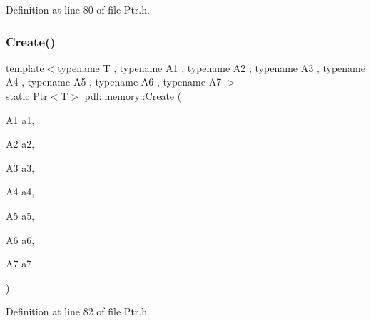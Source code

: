 Definition at line 80 of file Ptr.\+h.


\begin{DoxyCode}{0}

\end{DoxyCode}
\mbox{\label{namespacepdl_1_1memory_a10694890b7d9c279cc615fed02fd4baf}} 
\subsubsection{\texorpdfstring{Create()}{Create()}\hspace{0.1cm}{\footnotesize\ttfamily [8/8]}}
{\footnotesize\ttfamily template$<$typename T , typename A1 , typename A2 , typename A3 , typename A4 , typename A5 , typename A6 , typename A7 $>$ \\
static \mbox{\hyperlink{classpdl_1_1memory_1_1_ptr}{Ptr}}$<$T$>$ pdl\+::memory\+::\+Create (\begin{DoxyParamCaption}\item[{A1}]{a1,  }\item[{A2}]{a2,  }\item[{A3}]{a3,  }\item[{A4}]{a4,  }\item[{A5}]{a5,  }\item[{A6}]{a6,  }\item[{A7}]{a7 }\end{DoxyParamCaption})\hspace{0.3cm}{\ttfamily [static]}}



Definition at line 82 of file Ptr.\+h.


\begin{DoxyCode}{0}

\end{DoxyCode}
\mbox{\label{namespacepdl_1_1memory_adffabbae2ed36439e37df20ac5260dc7}} 
